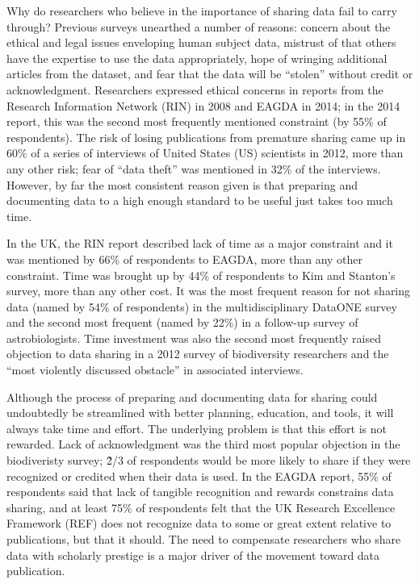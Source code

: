 \documentclass[10pt]{article}
\begin{document}
Why do researchers who believe in the importance of sharing data fail to carry through?
Previous surveys unearthed a number of reasons: concern about the ethical and legal issues enveloping human subject data, mistrust of that others have the expertise to use the data appropriately, hope of wringing additional articles from the dataset, and fear that the data will be ``stolen'' without credit or acknowledgment.
Researchers expressed ethical concerns in reports from the Research Information Network (RIN) in 2008 and EAGDA in 2014; in the 2014 report, this was the second most frequently mentioned constraint (by 55\% of respondents)\cite{swan_share_2008, bobrow_establishing_2014}.
The risk of losing publications from premature sharing came up in 60\% of a series of interviews of United States (US) scientists in 2012, more than any other risk; fear of ``data theft'' was mentioned in 32\% of the interviews\cite{kim_institutional_2012}.
However, by far the most consistent reason given is that preparing and documenting data to a high enough standard to be useful just takes too much time.

In the UK, the RIN report described lack of time as a major constraint\cite{swan_share_2008} and it was mentioned by 66\% of respondents to EAGDA, more than any other constraint\cite{bobrow_establishing_2014}.
Time was brought up by 44\% of respondents to Kim and Stanton's survey\cite{kim_institutional_2012}, more than any other cost.
It was the most frequent reason for not sharing data (named by 54\% of respondents) in the multidisciplinary DataONE survey \cite{tenopir_data_2011} and the second most frequent (named by 22\%) in a follow-up survey of astrobiologists\cite{aydinoglu_data_2014}.
Time investment was also the second most frequently raised objection to data sharing in a 2012 survey of biodiversity researchers and the ``most violently discussed obstacle'' in associated interviews\cite{enke_users_2012}.

Although the process of preparing and documenting data for sharing could undoubtedly be streamlined with better planning, education, and tools, it will always take time and effort.
The underlying problem is that this effort is not rewarded.
Lack of acknowledgment was the third most popular objection in the biodiveristy survey; \~2/3 of respondents would be more likely to share if they were recognized or credited when their data is used.
In the EAGDA report, 55\% of respondents said that lack of tangible recognition and rewards constrains data sharing, and at least 75\% of respondents felt that the UK Research Excellence Framework (REF) does not recognize data to some or great extent relative to publications, but that it should.
The need to compensate researchers who share data with scholarly prestige is a major driver of the movement toward data publication.
 
\end{document}
